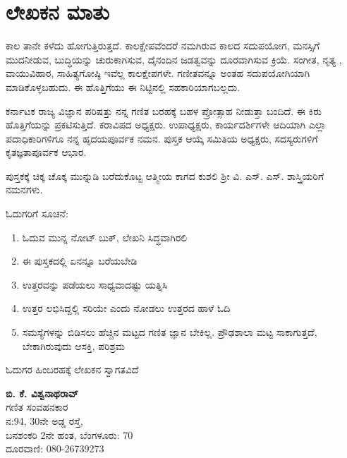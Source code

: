 {
\makeatletter
\def\@makechapterhead#1{%
  \vspace*{5\p@}%
  {\parindent \z@ \raggedright \normalfont
    \ifnum \c@secnumdepth >\m@ne
      \if@mainmatter
        \LARGE\bfseries \@chapapp\space\thechapter
        \vskip 4pt
        \par\nobreak
        \vskip 5\p@
      \fi
    \fi
    \interlinepenalty\@M
    \LARGE\bfseries #1\par\nobreak
    \vskip 15\p@
  }}
  \makeatother



\chapter{ಲೇಖಕನ ಮಾತು}





ಕಾಲ ತಾನೇ ಕಳೆದು ಹೋಗುತ್ತಿರುತ್ತದೆ. ಕಾಲಕ್ಷೇಪವೆಂದರೆ ನಮಗಿರುವ ಕಾಲದ ಸದುಪಯೋಗ, ಮನಸ್ಸಿಗೆ ಮುದನೀಡುವ, ಬುದ್ಧಿಯನ್ನು ಚುರುಕಾಗಿಸುವ, ದೈನಂದಿನ ಜಡತ್ವವನ್ನು ದೂರವಾಗಿಸುವ ಕ್ರಿಯೆ. ಸಂಗೀತ, ನೃತ್ಯ , ವಾಯುವಿಹಾರ, ಸಾಹಿತ್ಯಗೋಷ್ಠಿ ಇವೆಲ್ಲ ಕಾಲಕ್ಷೇಪಗಳೇ. ಗಣೀತವನ್ನೂ ಅಂತಹ ಸದುಪಯೋಗಿಯಾಗಿ ಮಾಡಿಕೊಳ್ಳಬಹುದು. ಈ ಹೊತ್ತಿಗೆಯು ಈ ನಿಟ್ಟಿನಲ್ಲಿ ಸಹಕಾರಿಯಾಗಬಲ್ಲದು. 

ಕರ್ನಾಟಕ ರಾಜ್ಯ ವಿಜ್ಞಾನ ಪರಿಷತ್ತು ನನ್ನ ಗಣಿತ ಬರಹಕ್ಕೆ ಬಹಳ ಪ್ರೋತ್ಸಾಹ ನೀಡುತ್ತಾ ಬಂದಿದೆ. ಈ ಕಿರು ಹೊತ್ತಿಗೆಯನ್ನು ಪ್ರಕಟಿಸುತ್ತಿದೆ. ಕರಾವಿಪದ ಅಧ್ಯಕ್ಷರು. ಉಪಾಧ್ಯಕ್ಷರು, ಕಾರ್ಯದರ್ಶಿಗಳೇ ಆದಿಯಾಗಿ ಎಲ್ಲಾ ಪದಾಧಿಕಾರಿಗಳಿಗೂ ನನ್ನ ಹೃದಯಪೂರ್ವಕ ನಮನ. ಪುಸ್ತಕ ಆಯ್ಕೆ ಸಮಿತಿಯ ಅಧ್ಯಕ್ಷರು, ಸದಸ್ಯರುಗಳಿಗೆ ಕೃತಜ್ಞತಾಪೂರ್ವಕ ಆಭಾರ. 

ಪುಸ್ತಕಕ್ಕೆ  ಚಿಕ್ಕ ಚೊಕ್ಕ ಮುನ್ನುಡಿ ಬರೆದುಕೊಟ್ಟ ಆತ್ಮೀಯ ಕಾಗದ ಕುಶಲಿ ಶ್ರೀ ವಿ. ಎಸ್. ಎಸ್.  ಶಾಸ್ತ್ರಿಯರಿಗೆ ನಮನಗಳು.

ಓದುಗರಿಗೆ ಸೂಚನೆ: 
\begin{enumerate}
\item ಓದುವ ಮುನ್ನ ನೋಟ್ ಬುಕ್, ಲೇಖನಿ ಸಿದ್ಧವಾಗಿರಲಿ 
\item ಈ ಪುಸ್ತಕದಲ್ಲಿ ಏನನ್ನೂ ಬರೆಯಬೇಡಿ 
\item ಉತ್ತರವನ್ನು ಪಡೆಯಲು ಸಾಧ್ಯವಾದಷ್ಟು ಯತ್ನಿಸಿ
\item ಉತ್ತರ ಲಭಿಸಿದ್ದಲ್ಲಿ ಸರಿಯೇ ಎಂದು ನೋಡಲು ಉತ್ತರದ ಹಾಳೆ ಓದಿ 
\item ಸಮಸ್ಯೆಗಳನ್ನು ಬಿಡಿಸಲು ಹೆಚ್ಚಿನ ಮಟ್ಟದ ಗಣಿತ ಜ್ಞಾನ ಬೇಕಿಲ್ಲ. ಪ್ರೌಢಶಾಲಾ ಮಟ್ಟ ಸಾಕಾಗುತ್ತದೆ, ಬೇಕಾಗಿರುವುದು ಆಸಕ್ತಿ, ಪರಿಶ್ರಮ 
\end{enumerate}
ಓದುಗರ ಹಿಂಬರಹಕ್ಕೆ ಲೇಖಕನ ಸ್ವಾಗತವಿದೆ 

\begin{flushright}
{\bf ಬಿ. ಕೆ. ವಿಶ್ವನಾಥರಾವ್}\\
ಗಣಿತ ಸಂವಹನಕಾರ\\
ನ:{\rm 94}, {\rm 30}ನೇ ಅಡ್ಡ ರಸ್ತೆ, \\
ಬನಶಂಕರಿ {\rm 2}ನೇ ಹಂತ, ಬೆಂಗಳೂರು: {\rm 70}\\
ದೂರವಾಣಿ: {\rm 080-26739273}
\end{flushright}


}



